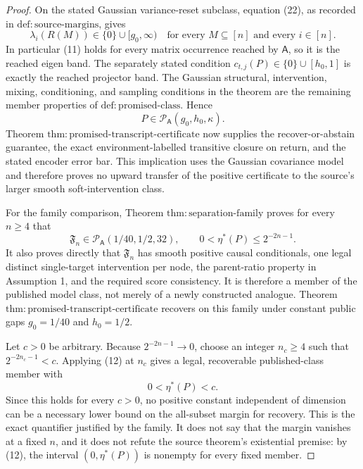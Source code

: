 \documentclass{article}
\begin{document}
\begin{proof}
On the stated Gaussian variance-reset subclass, equation (22), as recorded in \(\mathrm{def{:}source\mbox{-}margins}\), gives
\[
 \lambda_i(R(M))\in\{0\}\cup[g_0,\infty)
 \quad\text{for every }M\subseteq[n]\text{ and every }i\in[n].
 \tag{11}
\]
In particular (11) holds for every matrix occurrence reached by \(\mathsf A\), so it is the reached eigen band.  The separately stated condition \(c_{t,j}(P)\in\{0\}\cup[h_0,1]\) is exactly the reached projector band.  The Gaussian structural, intervention, mixing, conditioning, and sampling conditions in the theorem are the remaining member properties of \(\mathrm{def{:}promised\mbox{-}class}\).  Hence
\[
 P\in\mathcal P_{\mathsf A}(g_0,h_0,\kappa).
\]
Theorem \(\mathrm{thm{:}promised\mbox{-}transcript\mbox{-}certificate}\) now supplies the recover-or-abstain guarantee, the exact environment-labelled transitive closure on return, and the stated encoder error bar.  This implication uses the Gaussian covariance model and therefore proves no upward transfer of the positive certificate to the source's larger smooth soft-intervention class.

For the family comparison, Theorem \(\mathrm{thm{:}separation\mbox{-}family}\) proves for every \(n\ge4\) that
\[
 \mathfrak F_n\in\mathcal P_{\mathsf A}(1/40,1/2,32),
 \qquad
 0<\eta^{\ast}(P)\le2^{-2n-1}.
 \tag{12}
\]
It also proves directly that \(\mathfrak F_n\) has smooth positive causal conditionals, one legal distinct single-target intervention per node, the parent-ratio property in Assumption 1, and the required score consistency.  It is therefore a member of the published model class, not merely of a newly constructed analogue.  Theorem \(\mathrm{thm{:}promised\mbox{-}transcript\mbox{-}certificate}\) recovers on this family under constant public gaps \(g_0=1/40\) and \(h_0=1/2\).

Let \(c>0\) be arbitrary.  Because \(2^{-2n-1}\to0\), choose an integer \(n_c\ge4\) such that \(2^{-2n_c-1}<c\).  Applying (12) at \(n_c\) gives a legal, recoverable published-class member with
\[
 0<\eta^{\ast}(P)<c.
\]
Since this holds for every \(c>0\), no positive constant independent of dimension can be a necessary lower bound on the all-subset margin for recovery.  This is the exact quantifier justified by the family.  It does not say that the margin vanishes at a fixed \(n\), and it does not refute the source theorem's existential premise: by (12), the interval \((0,\eta^{\ast}(P))\) is nonempty for every fixed member.


\end{proof}
\end{document}
